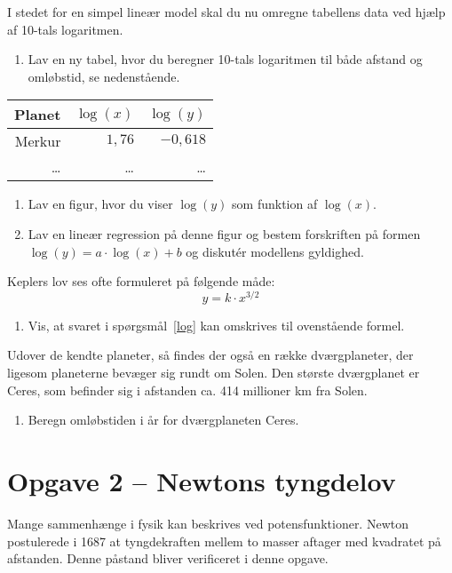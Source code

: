 \documentclass[12pt,oneside,a4paper]{article}
\theoremstyle{plain}
\begin{document}
I stedet for en simpel lineær model skal du nu omregne tabellens data ved hjælp af 
10-tals logaritmen.
\begin{enumerate}[label=(\alph*) ,resume]
    \item Lav en ny tabel, hvor du beregner 10-tals logaritmen til både afstand
        og omløbstid, se nedenstående.
\end{enumerate}

\begin{center}
\begin{tabular}{r|r|r}
    \hline
    Planet  & $\log(x)$   & $\log(y)$ \\
    \hline 
    Merkur  &  $1,76$ &   $-0,618$ \\
    \ldots  & \ldots    & \ldots  \\
    \hline 
\end{tabular}
\end{center}

\begin{enumerate}[label=(\alph*) ,resume]
    \item Lav en figur, hvor du viser $\log(y)$ som funktion af $\log(x)$.
    \item Lav en lineær regression på denne figur og bestem forskriften på formen
        $\log(y) = a\cdot\log(x)+b$ og diskutér modellens gyldighed. \label{log}
\end{enumerate}

Keplers lov ses ofte formuleret på følgende måde:
$$
y = k \cdot x^{3/2}
$$
\begin{enumerate}[label=(\alph*) ,resume]
    \item Vis, at svaret i spørgsmål~\ref{log} kan omskrives til ovenstående formel.
\end{enumerate}


Udover de kendte planeter, så findes der også en række dværgplaneter, der
ligesom planeterne bevæger sig rundt om Solen. Den største dværgplanet er
Ceres, som befinder sig i afstanden ca. 414 millioner km fra Solen.

\begin{enumerate}[label=(\alph*) ,resume]
    \item Beregn omløbstiden i år for dværgplaneten Ceres.
\end{enumerate}

\section*{Opgave 2 -- Newtons tyngdelov}
Mange sammenhænge i fysik kan beskrives ved potensfunktioner. Newton
postulerede i 1687 at tyngdekraften mellem to masser aftager med kvadratet på
afstanden.  Denne påstand bliver verificeret i denne opgave.
\end{document}
